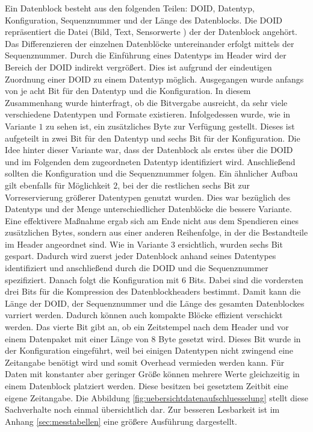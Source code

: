 Ein Datenblock besteht aus den folgenden Teilen: \gls{DOID}, Datentyp,
Konfiguration, Sequenznummer und der Länge des Datenblocks. Die \gls{DOID}
repräsentiert die Datei (Bild, Text, Sensorwerte \etc) der der Datenblock
angehört. Das Differenzieren der einzelnen Datenblöcke untereinander erfolgt
mittels der Sequenznummer. Durch die Einführung eines Datentyps im Header wird
der Bereich der \gls{DOID} indirekt vergrößert. Dies ist aufgrund der
eindeutigen Zuordnung einer \gls{DOID} zu einem Datentyp möglich.
\newline
Ausgegangen wurde anfangs von je acht Bit für den Datentyp und
die Konfiguration.
In diesem Zusammenhang wurde hinterfragt, ob die Bitvergabe ausreicht,
da sehr viele verschiedene Datentypen und Formate existieren. Infolgedessen
wurde, wie in Variante $1$ zu sehen ist, ein zusätzliches Byte zur Verfügung
gestellt. Dieses ist aufgeteilt in zwei Bit für den Datentyp und sechs Bit für
der Konfiguration. Die Idee hinter dieser Variante war, dass der Datenblock als
erstes über die \gls{DOID} und im Folgenden dem zugeordneten Datentyp identifiziert
wird. Anschließend sollten die Konfiguration und die Sequenznummer folgen.
Ein ähnlicher Aufbau gilt ebenfalls für Möglichkeit $2$, bei der die restlichen
sechs Bit zur Vorreservierung größerer Datentypen genutzt wurden. Dies war
bezüglich des Datentyps und der Menge unterschiedlicher Datenblöcke die bessere
Variante. Eine effektivere Maßnahme ergab sich am Ende nicht aus dem
Spendieren eines zusätzlichen Bytes, sondern aus einer anderen Reihenfolge, in
der die Bestandteile im Header angeordnet sind. Wie in Variante $3$ ersichtlich,
wurden sechs Bit gespart. Dadurch wird zuerst jeder Datenblock anhand
seines Datentypes identifiziert und anschließend durch die \gls{DOID} und die
Sequenznummer spezifiziert. Danach folgt die Konfiguration mit $6$ Bits.
Dabei sind die vordersten drei Bits für die Kompression des Datenblockheaders
bestimmt. Damit kann die Länge der \gls{DOID}, der Sequenznummer und die Länge
des gesamten Datenblockes varriert werden. Dadurch können auch kompakte Blöcke
effizient verschickt werden.
Das vierte Bit gibt an, ob ein Zeitstempel nach dem Header und vor einem
Datenpaket mit einer Länge von $8$ Byte gesetzt wird.
Dieses Bit wurde in der Konfiguration eingeführt, weil bei einigen Datentypen
nicht zwingend eine Zeitangabe benötigt wird und somit Overhead vermieden
werden kann. Für Daten mit konstanter aber geringer Größe können mehrere Werte
gleichzeitig in einem Datenblock platziert werden. Diese besitzen bei
gesetztem Zeitbit eine eigene Zeitangabe. Die Abbildung
\ref{fig:uebersichtdatenaufschluesselung} stellt diese Sachverhalte noch einmal
übersichtlich dar.  Zur besseren Lesbarkeit ist im Anhang \ref{sec:messtabellen}
eine größere Ausführung dargestellt.

